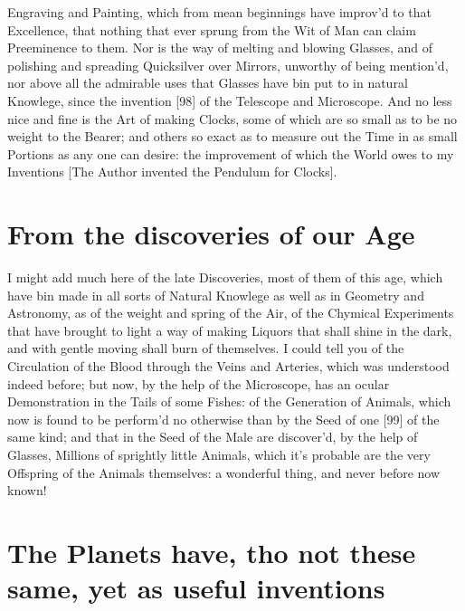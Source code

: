 \documentclass[letterpaper]{book}
\begin{document}
Engraving and Painting, which from mean beginnings have improv'd to that
Excellence, that nothing that ever sprung from the Wit of Man can claim
Preeminence to them. Nor is the way of melting and blowing Glasses, and of
polishing and spreading Quicksilver over Mirrors, unworthy of being
mention'd, nor above all the admirable uses that Glasses have bin put to in
natural Knowlege, since the invention [98] of the Telescope and Microscope.
And no less nice and fine is the Art of making Clocks, some of which are so
small as to be no weight to the Bearer; and others so exact as to measure
out the Time in as small Portions as any one can desire: the improvement of
which the World owes to my Inventions [The Author invented the Pendulum for
Clocks].


\section{From the discoveries of our Age}

I might add much here of the late Discoveries, most of them of this age,
which have bin made in all sorts of Natural Knowlege as well as in Geometry
and Astronomy, as of the weight and spring of the Air, of the Chymical
Experiments that have brought to light a way of making Liquors that shall
shine in the dark, and with gentle moving shall burn of themselves. I could
tell you of the Circulation of the Blood through the Veins and Arteries,
which was understood indeed before; but now, by the help of the Microscope,
has an ocular Demonstration in the Tails of some Fishes: of the Generation
of Animals, which now is found to be perform'd no otherwise than by the Seed
of one [99] of the same kind; and that in the Seed of the Male are
discover'd, by the help of Glasses, Millions of sprightly little Animals,
which it's probable are the very Off{s}pring of the Animals themselves: a
wonderful thing, and never before now known!


\section{The Planets have, tho not these same, yet as useful inventions}
\end{document}

